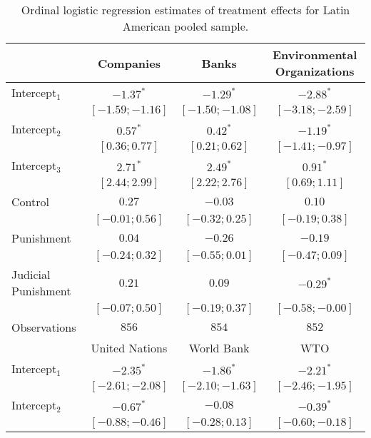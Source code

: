 \begin{table}[h]
\begin{center}
\caption{Ordinal logistic regression estimates of treatment effects for Latin American pooled sample.}
\begin{threeparttable}
\begin{tabular}{l c c c}
\hline
 & Companies & Banks & Environmental
Organizations \\
\hline
Intercept$_1$       & $-1.37^{*}$       & $-1.29^{*}$       & $-2.88^{*}$       \\
                    & $ [-1.59; -1.16]$ & $ [-1.50; -1.08]$ & $ [-3.18; -2.59]$ \\
Intercept$_2$       & $0.57^{*}$        & $0.42^{*}$        & $-1.19^{*}$       \\
                    & $ [ 0.36;  0.77]$ & $ [ 0.21;  0.62]$ & $ [-1.41; -0.97]$ \\
Intercept$_3$       & $2.71^{*}$        & $2.49^{*}$        & $0.91^{*}$        \\
                    & $ [ 2.44;  2.99]$ & $ [ 2.22;  2.76]$ & $ [ 0.69;  1.11]$ \\
Control             & $0.27$            & $-0.03$           & $0.10$            \\
                    & $ [-0.01;  0.56]$ & $ [-0.32;  0.25]$ & $ [-0.19;  0.38]$ \\
Punishment          & $0.04$            & $-0.26$           & $-0.19$           \\
                    & $ [-0.24;  0.32]$ & $ [-0.55;  0.01]$ & $ [-0.47;  0.09]$ \\
Judicial Punishment & $0.21$            & $0.09$            & $-0.29^{*}$       \\
                    & $ [-0.07;  0.50]$ & $ [-0.19;  0.37]$ & $ [-0.58; -0.00]$ \\
\hline
Observations        & $856$             & $854$             & $852$             \\
\hline
 & United Nations & World Bank & WTO \\
\hline
Intercept$_1$       & $-2.35^{*}$       & $-1.86^{*}$       & $-2.21^{*}$       \\
                    & $ [-2.61; -2.08]$ & $ [-2.10; -1.63]$ & $ [-2.46; -1.95]$ \\
Intercept$_2$       & $-0.67^{*}$       & $-0.08$           & $-0.39^{*}$       \\
                    & $ [-0.88; -0.46]$ & $ [-0.28;  0.13]$ & $ [-0.60; -0.18]$ \\

\end{tabular}
\end{threeparttable}
\end{center}
\end{table}
